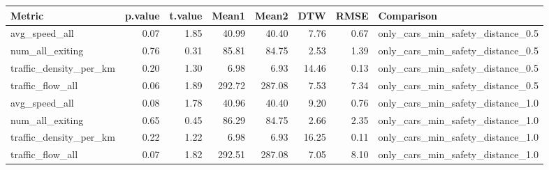 \begin{table}[ht]
\centering
\begin{tabular}{lrrrrrrl}
  \hline
Metric & p.value & t.value & Mean1 & Mean2 & DTW & RMSE & Comparison \\ 
  \hline
avg\_speed\_all & 0.07 & 1.85 & 40.99 & 40.40 & 7.76 & 0.67 & only\_cars\_min\_safety\_distance\_0.5 \\ 
  num\_all\_exiting & 0.76 & 0.31 & 85.81 & 84.75 & 2.53 & 1.39 & only\_cars\_min\_safety\_distance\_0.5 \\ 
  traffic\_density\_per\_km & 0.20 & 1.30 & 6.98 & 6.93 & 14.46 & 0.13 & only\_cars\_min\_safety\_distance\_0.5 \\ 
  traffic\_flow\_all & 0.06 & 1.89 & 292.72 & 287.08 & 7.53 & 7.34 & only\_cars\_min\_safety\_distance\_0.5 \\ 
  avg\_speed\_all & 0.08 & 1.78 & 40.96 & 40.40 & 9.20 & 0.76 & only\_cars\_min\_safety\_distance\_1.0 \\ 
  num\_all\_exiting & 0.65 & 0.45 & 86.29 & 84.75 & 2.66 & 2.35 & only\_cars\_min\_safety\_distance\_1.0 \\ 
  traffic\_density\_per\_km & 0.22 & 1.22 & 6.98 & 6.93 & 16.25 & 0.11 & only\_cars\_min\_safety\_distance\_1.0 \\ 
  traffic\_flow\_all & 0.07 & 1.82 & 292.51 & 287.08 & 7.05 & 8.10 & only\_cars\_min\_safety\_distance\_1.0 \\ 
   \hline
\end{tabular}
\end{table}
